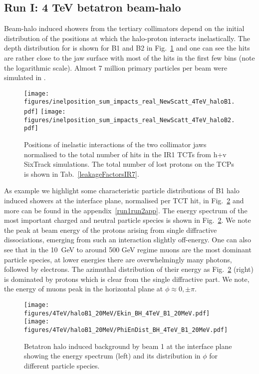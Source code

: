 \subsection{Run I: 4 TeV betatron beam-halo}

Beam-halo induced showers from the tertiary collimators depend on the initial distribution of the positions at which the halo-proton interacts inelastically.
The depth distribution for is shown for B1 and B2 in Fig.~\ref{inel4TeV} and one can see the hits are rather close to the jaw surface with most of the hits in the first few bins (note the logarithmic scale). Almost 7 million primary particles per beam were simulated in \fluka.

\begin{figure}[!htb]
\centering
\texttt{[image: figures/inelposition\_sum\_impacts\_real\_NewScatt\_4TeV\_haloB1.pdf]}
\texttt{[image: figures/inelposition\_sum\_impacts\_real\_NewScatt\_4TeV\_haloB2.pdf]}
 \caption{Positions of inelastic interactions of the two collimator jaws normalised to the total number of hits in the IR1 TCTs from h+v SixTrack simulations. The total number of lost protons on the TCPs is shown in Tab.~\ref{leakageFactorsIR7}.
  \label{inel4TeV}}
\end{figure}

As example we highlight some characteristic particle distributions of B1 halo induced showers at the interface plane, normalised per TCT hit, in Fig.~\ref{dist4TeVB1} and more can be found in the appendix~\ref{run1run2app}. The energy spectrum of the most important charged and neutral particle species is shown in Fig.~\ref{dist4TeVB1}. We note the peak at beam energy of the protons arising from single diffractive dissociations, emerging from such an interaction slightly off-energy. One can also see that in the 10~GeV to around 500 GeV regime muons are the most dominant particle species, at lower energies there are overwhelmingly many photons, followed by electrons. The azimuthal distribution of their energy as Fig.~\ref{dist4TeVB1} (right) is dominated by protons which is clear from the single diffractive part. We note, the energy of muons peak in the horizontal plane at $\phi \approx 0, \pm \pi$. 

\begin{figure}%
\begin{center}
\texttt{[image: figures/4TeV/haloB1\_20MeV/Ekin\_BH\_4TeV\_B1\_20MeV.pdf]}
\texttt{[image: figures/4TeV/haloB1\_20MeV/PhiEnDist\_BH\_4TeV\_B1\_20MeV.pdf]}
\end{center}
\vspace{-0.6cm}
 \caption{Betatron halo induced background by beam 1 at the interface plane showing the energy spectrum (left) and its distribution in $\phi$ for different particle species.
  \label{dist4TeVB1}}
\end{figure}

